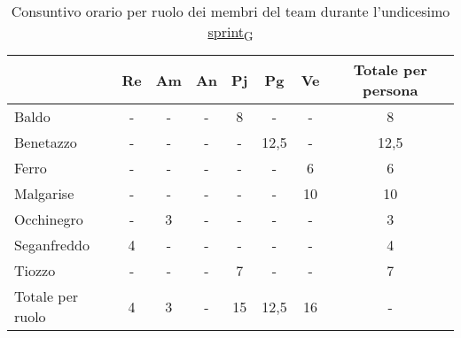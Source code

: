 \newpage
{}
\begin{table}[!h]
    \centering
    \begin{tabular}{ | l | c | c | c | c | c | c | c | }
        \hline
        \textbf{} & \textbf{Re} & \textbf{Am} &\textbf{An} & \textbf{Pj} & \textbf{Pg} & \textbf{Ve} & \textbf{Totale per persona} \\
        \hline
        Baldo            &  -   &  -   &  -   &  8   &  -   &  -   &  8   \\
        Benetazzo        &  -   &  -   &  -   &  -   & 12,5 &  -   & 12,5 \\
        Ferro            &  -   &  -   &  -   &  -   &  -   &  6   &  6   \\
        Malgarise        &  -   &  -   &  -   &  -   &  -   & 10   & 10   \\
        Occhinegro       &  -   &  3   &  -   &  -   &  -   &  -   &  3   \\
        Seganfreddo      &  4   &  -   &  -   &  -   &  -   &  -   &  4   \\
        Tiozzo           &  -   &  -   &  -   &  7   &  -   &  -   &  7   \\
        \hline
        Totale per ruolo &  4   &  3   &  -   & 15   & 12,5 & 16   &  -   \\
        \hline
    \end{tabular}
    \caption{Consuntivo orario per ruolo dei membri del team durante l'undicesimo \href{https://7last.github.io/docs/pb/documentazione-interna/glossario\#sprint}{sprint\textsubscript{G}}}
\end{table}

